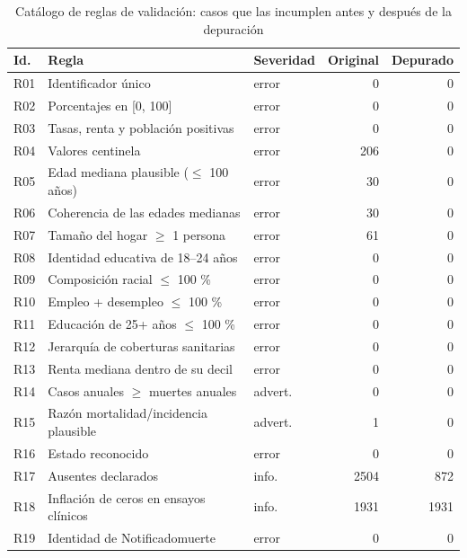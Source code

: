 \begin{table}[htbp]
\centering
\small
\caption{Catálogo de reglas de validación: casos que las incumplen antes y después de la depuración}\label{tab:validacion}
\begin{tabularx}{\linewidth}{l >{\raggedright\arraybackslash}X l r r}
\toprule
Id. & Regla & Severidad & Original & Depurado \\
\midrule
R01 & Identificador único & error & \num{0} & \num{0} \\
R02 & Porcentajes en [0, 100] & error & \num{0} & \num{0} \\
R03 & Tasas, renta y población positivas & error & \num{0} & \num{0} \\
R04 & Valores centinela & error & \num{206} & \num{0} \\
R05 & Edad mediana plausible ($\leq$ 100 años) & error & \num{30} & \num{0} \\
R06 & Coherencia de las edades medianas & error & \num{30} & \num{0} \\
R07 & Tamaño del hogar $\geq$ 1 persona & error & \num{61} & \num{0} \\
R08 & Identidad educativa de 18–24 años & error & \num{0} & \num{0} \\
R09 & Composición racial $\leq$ 100 \% & error & \num{0} & \num{0} \\
R10 & Empleo + desempleo $\leq$ 100 \% & error & \num{0} & \num{0} \\
R11 & Educación de 25+ años $\leq$ 100 \% & error & \num{0} & \num{0} \\
R12 & Jerarquía de coberturas sanitarias & error & \num{0} & \num{0} \\
R13 & Renta mediana dentro de su decil & error & \num{0} & \num{0} \\
R14 & Casos anuales $\geq$ muertes anuales & advert. & \num{0} & \num{0} \\
R15 & Razón mortalidad/incidencia plausible & advert. & \num{1} & \num{0} \\
R16 & Estado reconocido & error & \num{0} & \num{0} \\
R17 & Ausentes declarados & info. & \num{2504} & \num{872} \\
R18 & Inflación de ceros en ensayos clínicos & info. & \num{1931} & \num{1931} \\
R19 & Identidad de Notificadomuerte & error & \num{0} & \num{0} \\
\bottomrule
\end{tabularx}
\par{}
\end{table}
